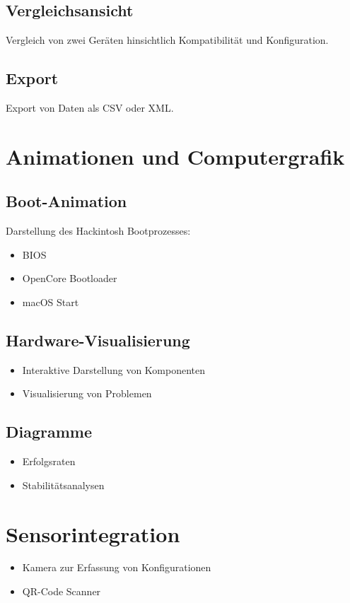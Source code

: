 \documentclass[a4paper,12pt]{article}
\begin{document}
\subsection{Vergleichsansicht}
Vergleich von zwei Geräten hinsichtlich Kompatibilität und Konfiguration.

\subsection{Export}
Export von Daten als CSV oder XML.

\section{Animationen und Computergrafik}

\subsection{Boot-Animation}
Darstellung des Hackintosh Bootprozesses:
\begin{itemize}
\item BIOS
\item OpenCore Bootloader
\item macOS Start
\end{itemize}

\subsection{Hardware-Visualisierung}
\begin{itemize}
\item Interaktive Darstellung von Komponenten
\item Visualisierung von Problemen
\end{itemize}

\subsection{Diagramme}
\begin{itemize}
\item Erfolgsraten
\item Stabilitätsanalysen
\end{itemize}

\section{Sensorintegration}
\begin{itemize}
\item Kamera zur Erfassung von Konfigurationen
\item QR-Code Scanner
\end{itemize}
\end{document}
